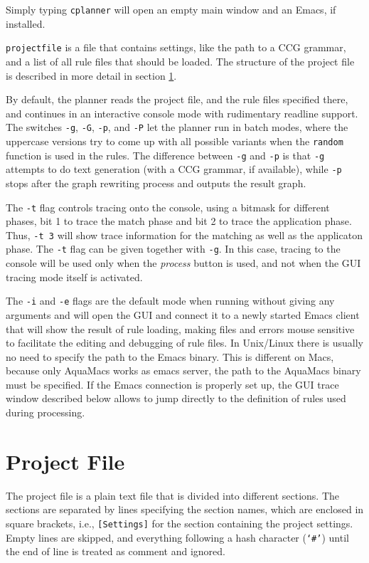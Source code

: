 \documentclass[11pt,a4paper]{report}
\begin{document}
Simply typing \texttt{cplanner} will open an empty main window and an Emacs, if
installed.

\texttt{projectfile} is a file that contains settings, like the path to a CCG
grammar, and a list of all rule files that should be loaded. The structure of
the project file is described in more detail in section \ref{sec:projectfile}.

By default, the planner reads the project file, and the rule files specified
there, and continues in an interactive console mode with rudimentary readline
support. The switches \texttt{-g}, \texttt{-G}, \texttt{-p}, and \texttt{-P}
let the planner run in batch modes, where the uppercase versions try to come up
with all possible variants when the \texttt{random} function is used in the
rules. The difference between \texttt{-g} and \texttt{-p} is that \texttt{-g}
attempts to do text generation (with a CCG grammar, if available), while
\texttt{-p} stops after the graph rewriting process and outputs the result
graph.

\noindent{}The \texttt{-t} flag controls tracing onto the console, using a
bitmask for different phases, bit 1 to trace the match phase and bit 2 to trace
the application phase. Thus, \texttt{-t 3} will show trace information for the
matching as well as the applicaton phase. The \texttt{-t} flag can be given
together with \texttt{-g}.  In this case, tracing to the console will be used
only when the \emph{process} button is used, and not when the GUI tracing mode
itself is activated.

The \texttt{-i} and \texttt{-e} flags are the default mode when running without
giving any arguments and will open the GUI and connect it to a newly started
Emacs client that will show the result of rule loading, making files and errors
mouse sensitive to facilitate the editing and debugging of rule files. In
Unix/Linux there is usually no need to specify the path to the Emacs
binary. This is different on Macs, because only AquaMacs works as emacs server,
the path to the AquaMacs binary must be specified. If the Emacs connection is
properly set up, the GUI trace window described below allows to jump directly
to the definition of rules used during processing.

\chapter{Project File}
\label{sec:projectfile}

The project file is a plain text file that is divided into different sections.
The sections are separated by lines specifying the section names, which are
enclosed in square brackets, i.e., \texttt{[Settings]} for the section
containing the project settings. Empty lines are skipped, and everything
following a hash character (\texttt{`\#'}) until the end of line is treated as
comment and ignored.
\end{document}
